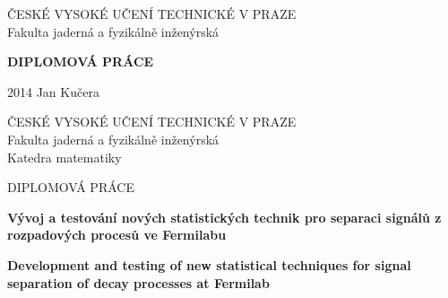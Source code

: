 
\thispagestyle{empty}

\begin{center}

{\Large \v{C}ESK\'E VYSOK\'E U\v{C}EN\'I TECHNICK\'E V PRAZE} \\[3.5mm]
{\Large Fakulta jadern\'a a fyzik\'alně in\v{z}en\'yrsk\'a}


{\Huge\textbf{DIPLOMOV\'A PR\'ACE}}


{\Large \hspace*{1cm} 2014 \hfill Jan Ku\v{c}era\hspace*{1cm}}

\end{center}


\newpage

\thispagestyle{empty}

\begin{center}

{\Large \v{C}ESK\'E VYSOK\'E U\v{C}EN\'I TECHNICK\'E V PRAZE} \\[3.5mm]
{\Large Fakulta jadern\'a a fyzik\'alně in\v{z}en\'yrsk\'a} \\[3.5mm]
{\Large Katedra matematiky}


{\Large DIPLOMOV\'A PR\'ACE}


{\LARGE
\textbf{V\'yvoj a testov\'an\'i nov\'ych statistick\'ych technik pro separaci sign\'al\r{u} z rozpadov\'ych proces\r{u} ve Fermilabu}
\par}

\vspace{1cm}

{\LARGE
\textbf{Development and testing of new statistical techniques for signal separation of decay processes at Fermilab}
\par}


\end{center}

